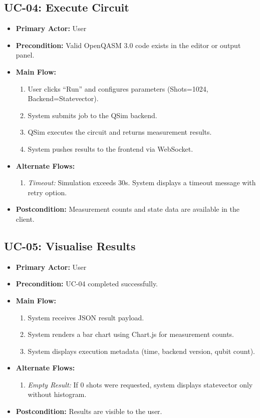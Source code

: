 \subsection{UC-04: Execute Circuit}
\begin{itemize}
    \item \textbf{Primary Actor:} User
    \item \textbf{Precondition:} Valid OpenQASM 3.0 code exists in the editor or output panel.
    \item \textbf{Main Flow:}
    \begin{enumerate}
        \item User clicks ``Run'' and configures parameters (Shots=1024, Backend=Statevector).
        \item System submits job to the QSim backend.
        \item QSim executes the circuit and returns measurement results.
        \item System pushes results to the frontend via WebSocket.
    \end{enumerate}
    \item \textbf{Alternate Flows:}
    \begin{enumerate}
        \item [2a] \textit{Timeout:} Simulation exceeds 30s. System displays a timeout message with retry option.
    \end{enumerate}
    \item \textbf{Postcondition:} Measurement counts and state data are available in the client.
\end{itemize}

\subsection{UC-05: Visualise Results}
\begin{itemize}
    \item \textbf{Primary Actor:} User
    \item \textbf{Precondition:} UC-04 completed successfully.
    \item \textbf{Main Flow:}
    \begin{enumerate}
        \item System receives JSON result payload.
        \item System renders a bar chart using Chart.js for measurement counts.
        \item System displays execution metadata (time, backend version, qubit count).
    \end{enumerate}
    \item \textbf{Alternate Flows:}
    \begin{enumerate}
        \item [2a] \textit{Empty Result:} If 0 shots were requested, system displays statevector only without histogram.
    \end{enumerate}
    \item \textbf{Postcondition:} Results are visible to the user.
\end{itemize}

